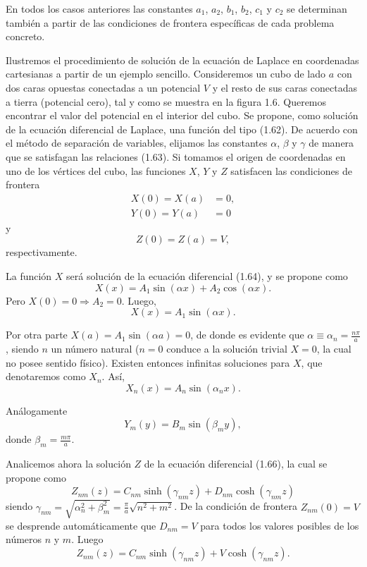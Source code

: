 \documentclass[12pt,a4paper]{book}
\begin{document}
En todos los casos anteriores las constantes $a_1$, $a_2$, $b_1$, $b_2$, $c_1$ y $c_2$ se determinan también a partir de las condiciones de frontera específicas de cada problema concreto.

Ilustremos el procedimiento de solución de la ecuación de Laplace en coordenadas cartesianas a partir de un ejemplo sencillo. Consideremos un cubo de lado $a$ con dos caras opuestas conectadas a un potencial $V$ y el resto de sus caras conectadas a tierra (potencial cero), tal y como se muestra en la figura 1.6. Queremos encontrar el valor del potencial en el interior del cubo. Se propone, como solución de la ecuación diferencial de Laplace, una función del tipo (1.62). De acuerdo con el método de separación de variables, elijamos las constantes $\alpha$, $\beta$ y $\gamma$ de manera que se satisfagan las relaciones (1.63). Si tomamos el origen de coordenadas en uno de los vértices del cubo, las funciones $X$, $Y$ y $Z$ satisfacen las condiciones de frontera
\begin{align}
X(0) = X(a) &= 0, \\
Y(0) = Y(a) &= 0
\end{align}
y
\begin{equation}
Z(0) = Z(a) = V,
\end{equation}
respectivamente.

La función $X$ será solución de la ecuación diferencial (1.64), y se propone como
\begin{equation}
X(x) = A_1 \sin(\alpha x) + A_2 \cos(\alpha x).
\end{equation}
Pero $X(0) = 0 \Rightarrow A_2 = 0$. Luego,
\begin{equation}
X(x) = A_1 \sin(\alpha x).
\end{equation}

Por otra parte $X(a) = A_1 \sin(\alpha a) = 0$, de donde es evidente que $\alpha \equiv \alpha_n = \frac{n\pi}{a}$, siendo $n$ un número natural ($n = 0$ conduce a la solución trivial $X = 0$, la cual no posee sentido físico). Existen entonces infinitas soluciones para $X$, que denotaremos como $X_n$. Así,
\begin{equation}
X_n(x) = A_n \sin(\alpha_n x).
\end{equation}

Análogamente
\begin{equation}
Y_m(y) = B_m \sin(\beta_m y),
\end{equation}
donde $\beta_m = \frac{m\pi}{a}$.

Analicemos ahora la solución $Z$ de la ecuación diferencial (1.66), la cual se propone como
\begin{equation}
Z_{nm}(z) = C_{nm} \sinh(\gamma_{nm} z) + D_{nm} \cosh(\gamma_{nm} z)
\end{equation}
siendo $\gamma_{nm} = \sqrt{\alpha_n^2 + \beta_m^2} = \frac{\pi}{a}\sqrt{n^2 + m^2}$. De la condición de frontera $Z_{nm}(0) = V$ se desprende automáticamente que $D_{nm} = V$ para todos los valores posibles de los números $n$ y $m$. Luego
\begin{equation}
Z_{nm}(z) = C_{nm} \sinh(\gamma_{nm} z) + V \cosh(\gamma_{nm} z).
\end{equation}
\end{document}
